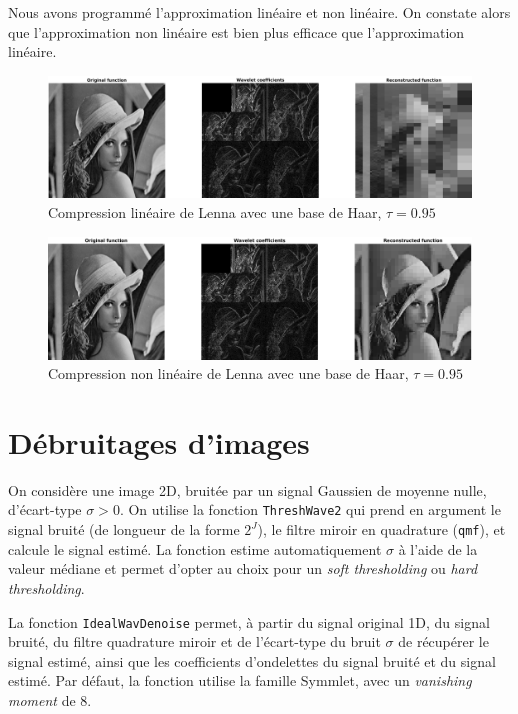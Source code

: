 \documentclass[a4paper,12pt, openany, twoside]{article}
\theoremstyle{break}
\begin{document}
Nous avons programmé l'approximation linéaire et non linéaire. On constate alors que l'approximation non linéaire est bien plus efficace que l'approximation linéaire.

\begin{figure}[H]
  \centering
  \includegraphics[width=\textwidth]{comp_LennaHaar95bis.png}\vfill
  \caption{Compression linéaire de Lenna avec une base de Haar, $\tau=0.95$}
\end{figure}


\begin{figure}[H]
  \centering
  \includegraphics[width=\textwidth]{comp_LennaHaar95.png}\vfill
  \caption{Compression non linéaire de Lenna avec une base de Haar, $\tau=0.95$}
\end{figure}


\clearpage
\section{Débruitages d'images}
On considère une image 2D, bruitée par un signal Gaussien de moyenne nulle, d'écart-type $\sigma > 0$. On utilise la fonction \texttt{ThreshWave2} qui prend en argument le signal bruité (de longueur de la forme $2^J$), le filtre miroir en quadrature (\texttt{qmf}), et calcule le signal estimé. La fonction estime automatiquement $\sigma$ à l'aide de la valeur médiane et permet d'opter au choix pour un \textit{soft thresholding} ou \textit{hard thresholding}.

La fonction \texttt{IdealWavDenoise} permet, à partir du signal original 1D, du signal bruité, du filtre quadrature miroir et de l'écart-type du bruit $\sigma$ de récupérer le signal estimé, ainsi que les coefficients d'ondelettes du signal bruité et du signal estimé. Par défaut, la fonction utilise la famille Symmlet, avec un \textit{vanishing moment} de 8.
\end{document}
